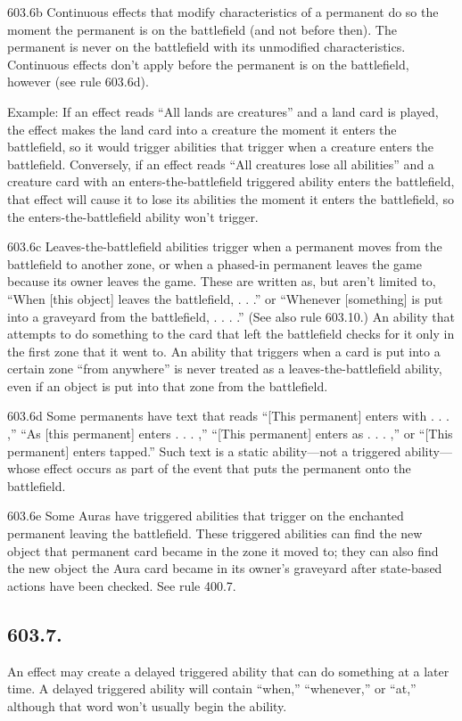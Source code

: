 603.6b Continuous effects that modify characteristics of a permanent do so the moment the permanent is on the battlefield (and not before then). The permanent is never on the battlefield with its unmodified characteristics. Continuous effects don’t apply before the permanent is on the battlefield, however (see rule 603.6d).

Example: If an effect reads “All lands are creatures” and a land card is played, the effect makes the land card into a creature the moment it enters the battlefield, so it would trigger abilities that trigger when a creature enters the battlefield. Conversely, if an effect reads “All creatures lose all abilities” and a creature card with an enters-the-battlefield triggered ability enters the battlefield, that effect will cause it to lose its abilities the moment it enters the battlefield, so the enters-the-battlefield ability won’t trigger.

603.6c Leaves-the-battlefield abilities trigger when a permanent moves from the battlefield to another zone, or when a phased-in permanent leaves the game because its owner leaves the game. These are written as, but aren’t limited to, “When [this object] leaves the battlefield, . . .” or “Whenever [something] is put into a graveyard from the battlefield, . . . .” (See also rule 603.10.) An ability that attempts to do something to the card that left the battlefield checks for it only in the first zone that it went to. An ability that triggers when a card is put into a certain zone “from anywhere” is never treated as a leaves-the-battlefield ability, even if an object is put into that zone from the battlefield.

603.6d Some permanents have text that reads “[This permanent] enters with . . . ,” “As [this permanent] enters . . . ,” “[This permanent] enters as . . . ,” or “[This permanent] enters tapped.” Such text is a static ability—not a triggered ability—whose effect occurs as part of the event that puts the permanent onto the battlefield.

603.6e Some Auras have triggered abilities that trigger on the enchanted permanent leaving the battlefield. These triggered abilities can find the new object that permanent card became in the zone it moved to; they can also find the new object the Aura card became in its owner’s graveyard after state-based actions have been checked. See rule 400.7.

\subsection*{603.7.}
An effect may create a delayed triggered ability that can do something at a later time. A delayed triggered ability will contain “when,” “whenever,” or “at,” although that word won’t usually begin the ability.

